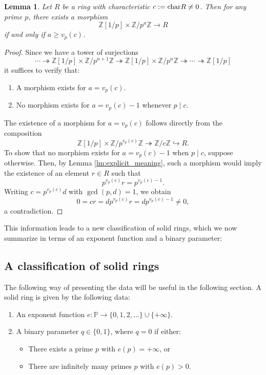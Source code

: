 \documentclass{amsart}
\newtheorem{lemma}[subsection]{Lemma}
\newcommand{\chara}{{\textup{char}}}
\newcommand{\Z}{{\mathbb Z}}
\renewcommand{\P}{{\mathbb P}}
\begin{document}
    \begin{lemma}
        Let $R$ be a ring with characteristic $c := \chara{R} \not= 0$.
        Then for any prime $p$, there exists a morphism
        $$
        \Z[1/p] \times \Z/p^{a}\Z \to R
        $$
        if and only if $a \geq v_p(c)$.
    \end{lemma}
    \begin{proof}
        Since we have a tower of surjections
        $$
        \cdots \twoheadrightarrow
        \Z[1/p] \times \Z/p^{n+1}\Z \twoheadrightarrow
        \Z[1/p] \times \Z/p^{n}\Z \twoheadrightarrow
        \cdots \twoheadrightarrow \Z[1/p]
        $$
        it suffices to verify that:
        \begin{enumerate}
            \item[1.]
            A morphism exists for $a = v_p(c)$.

            \item[2.]
            No morphism exists for $a = v_p(c) - 1$ whenever $p \mid c$.
        \end{enumerate}
        The existence of a morphism for $a = v_p(c)$ follows directly from the composition
        $$
        \Z[1/p] \times \Z/p^{v_p(c)}\Z \twoheadrightarrow
        \Z/c\Z \hookrightarrow
        R.
        $$
        To show that no morphism exists for $a = v_p(c) - 1$ when $p \mid c$, suppose otherwise.
        Then, by Lemma \ref{lm:explicit_meaning}, such a morphism would imply the existence of an element $r \in R$ such that
        $$
        p^{v_p(c)}r = p^{v_p(c)-1}.
        $$
        Writing $c = p^{v_p(c)}d$ with $\gcd(p,d) = 1$, we obtain
        $$
        0 = cr = dp^{v_p(c)}r = dp^{v_p(c)-1} \not= 0,
        $$
        a contradiction.
    \end{proof}

    This information leads to a new classification of solid rings, which we now summarize in terms of an exponent function and a binary parameter:

    \subsection{A classification of solid rings}
    \label{ssc:class}

    The following way of presenting the data will be useful in the following section.
    A solid ring is given by the following data:
    \begin{enumerate}
        \item
        An exponent function $e: \P \to \{0, 1, 2, \dots\} \cup \{+\infty\}$.
        \item 
        A binary parameter $q \in \{0,1\}$, where $q = 0$ if either:
        \begin{itemize}
            \item 
            There exists a prime $p$ with $e(p) = +\infty$, or

            \item 
            There are infinitely many primes $p$ with $e(p) > 0$.
        \end{itemize}
    \end{enumerate}
\end{document}
